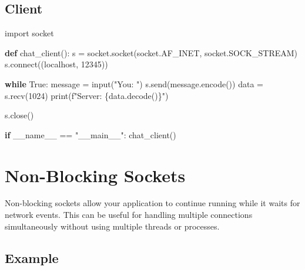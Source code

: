 \documentclass[
  letterpaper,
  DIV=11,
  numbers=noendperiod]{scrreprt}
\newenvironment{Shaded}{\begin{snugshade}}{\end{snugshade}}
\newcommand{\BuiltInTok}[1]{\textcolor[rgb]{0.00,0.23,0.31}{#1}}
\newcommand{\ControlFlowTok}[1]{\textcolor[rgb]{0.00,0.23,0.31}{\textbf{#1}}}
\newcommand{\DecValTok}[1]{\textcolor[rgb]{0.68,0.00,0.00}{#1}}
\newcommand{\ExtensionTok}[1]{\textcolor[rgb]{0.00,0.23,0.31}{#1}}
\newcommand{\ImportTok}[1]{\textcolor[rgb]{0.00,0.46,0.62}{#1}}
\newcommand{\KeywordTok}[1]{\textcolor[rgb]{0.00,0.23,0.31}{\textbf{#1}}}
\newcommand{\NormalTok}[1]{\textcolor[rgb]{0.00,0.23,0.31}{#1}}
\newcommand{\OperatorTok}[1]{\textcolor[rgb]{0.37,0.37,0.37}{#1}}
\newcommand{\SpecialCharTok}[1]{\textcolor[rgb]{0.37,0.37,0.37}{#1}}
\newcommand{\SpecialStringTok}[1]{\textcolor[rgb]{0.13,0.47,0.30}{#1}}
\newcommand{\StringTok}[1]{\textcolor[rgb]{0.13,0.47,0.30}{#1}}
\newcommand{\VariableTok}[1]{\textcolor[rgb]{0.07,0.07,0.07}{#1}}
\begin{document}
\subsection{Client}\label{client}

\begin{Shaded}
\begin{Highlighting}[]
\ImportTok{import}\NormalTok{ socket}

\KeywordTok{def}\NormalTok{ chat\_client():}
\NormalTok{    s }\OperatorTok{=}\NormalTok{ socket.socket(socket.AF\_INET, socket.SOCK\_STREAM)}
\NormalTok{    s.}\ExtensionTok{connect}\NormalTok{((}\StringTok{\textquotesingle{}localhost\textquotesingle{}}\NormalTok{, }\DecValTok{12345}\NormalTok{))}
    
    \ControlFlowTok{while} \VariableTok{True}\NormalTok{:}
\NormalTok{        message }\OperatorTok{=} \BuiltInTok{input}\NormalTok{(}\StringTok{"You: "}\NormalTok{)}
\NormalTok{        s.send(message.encode())}
\NormalTok{        data }\OperatorTok{=}\NormalTok{ s.recv(}\DecValTok{1024}\NormalTok{)}
        \BuiltInTok{print}\NormalTok{(}\SpecialStringTok{f"Server: }\SpecialCharTok{\{}\NormalTok{data}\SpecialCharTok{.}\NormalTok{decode()}\SpecialCharTok{\}}\SpecialStringTok{"}\NormalTok{)}
    
\NormalTok{    s.close()}

\ControlFlowTok{if} \VariableTok{\_\_name\_\_} \OperatorTok{==} \StringTok{"\_\_main\_\_"}\NormalTok{:}
\NormalTok{    chat\_client()}
\end{Highlighting}
\end{Shaded}

\section{Non-Blocking Sockets}\label{non-blocking-sockets}

Non-blocking sockets allow your application to continue running while it
waits for network events. This can be useful for handling multiple
connections simultaneously without using multiple threads or processes.

\subsection{Example}\label{example-15}
\end{document}
